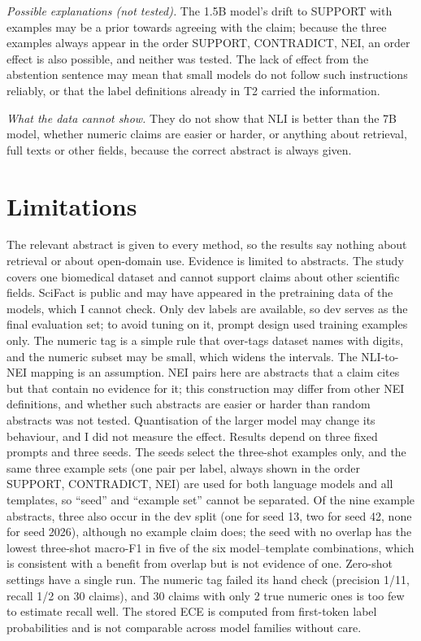 \documentclass[conference]{IEEEtran}
\begin{document}
\emph{Possible explanations (not tested).} The 1.5B model's drift to SUPPORT with examples may be a prior towards agreeing with the claim; because the three examples always appear in the order SUPPORT, CONTRADICT, NEI, an order effect is also possible, and neither was tested. The lack of effect from the abstention sentence may mean that small models do not follow such instructions reliably, or that the label definitions already in T2 carried the information.

\emph{What the data cannot show.} They do not show that NLI is better than the 7B model, whether numeric claims are easier or harder, or anything about retrieval, full texts or other fields, because the correct abstract is always given.

\section{Limitations}
The relevant abstract is given to every method, so the results say nothing about retrieval or about open-domain use. Evidence is limited to abstracts. The study covers one biomedical dataset and cannot support claims about other scientific fields. SciFact is public and may have appeared in the pretraining data of the models, which I cannot check. Only dev labels are available, so dev serves as the final evaluation set; to avoid tuning on it, prompt design used training examples only. The numeric tag is a simple rule that over-tags dataset names with digits, and the numeric subset may be small, which widens the intervals. The NLI-to-NEI mapping is an assumption. NEI pairs here are abstracts that a claim cites but that contain no evidence for it; this construction \cite{kumar2026} may differ from other NEI definitions, and whether such abstracts are easier or harder than random abstracts was not tested. Quantisation of the larger model may change its behaviour, and I did not measure the effect. Results depend on three fixed prompts and three seeds. The seeds select the three-shot examples only, and the same three example sets (one pair per label, always shown in the order SUPPORT, CONTRADICT, NEI) are used for both language models and all templates, so ``seed'' and ``example set'' cannot be separated. Of the nine example abstracts, three also occur in the dev split (one for seed 13, two for seed 42, none for seed 2026), although no example claim does; the seed with no overlap has the lowest three-shot macro-F1 in five of the six model--template combinations, which is consistent with a benefit from overlap but is not evidence of one. Zero-shot settings have a single run. The numeric tag failed its hand check (precision 1/11, recall 1/2 on 30 claims), and 30 claims with only 2 true numeric ones is too few to estimate recall well. The stored ECE is computed from first-token label probabilities and is not comparable across model families without care.
\end{document}
